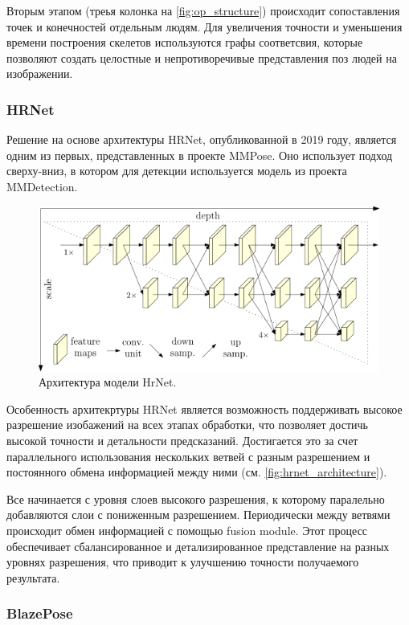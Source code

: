 Вторым этапом (треья колонка на \autoref{fig:op_structure}) происходит сопоставления точек и конечностей отдельным людям. Для увеличения точности и уменьшения времени построения скелетов используются графы соответсвия, которые позволяют создать целостные и непротиворечивые представления поз людей на изображении.

\subsubsection*{HRNet}

Решение на основе архитектуры HRNet, опубликованной в 2019 году, является одним из первых, представленных в проекте MMPose. Оно использует подход сверху-вниз, в котором для детекции используется модель из проекта MMDetection.

\begin{figure}[h]
	\centering
	\includegraphics[width=.9\textwidth]{./images/hrnet_architecture}
	\caption{Архитектура модели HrNet. \cite{hrnet}}
	\label{fig:hrnet_architecture}
\end{figure}

Особенность архитекртуры HRNet является возможность поддерживать высокое разрешение изобажений на всех этапах обработки, что позволяет достичь высокой точности и детальности предсказаний. Достигается это за счет параллельного использования нескольких ветвей с разным разрешением и постоянного обмена информацией между ними (см. \autoref{fig:hrnet_architecture}).

Все начинается с уровня слоев высокого разрешения, к которому паралельно добавляются слои с пониженным разрешением. Периодически между ветвями происходит обмен  информацией с помощью fusion module. Этот процесс обеспечивает сбалансированное и детализированное представление на разных уровнях разрешения, что приводит к улучшению точности получаемого результата.

\subsubsection*{BlazePose}

